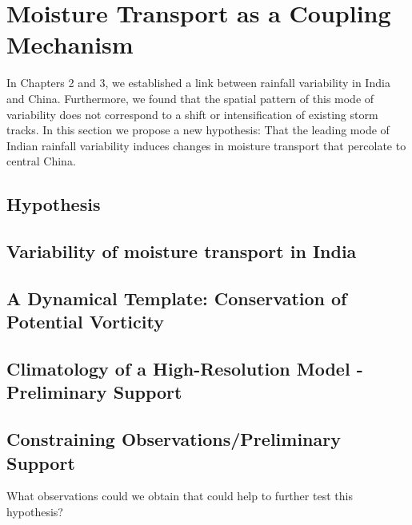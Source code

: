 \chapter{Moisture Transport as a Coupling Mechanism}

In Chapters 2 and 3, we established a link between rainfall variability in India and China. Furthermore, we found that the spatial pattern of this mode of variability does not correspond to a shift or intensification of existing storm tracks. In this section we propose a new hypothesis: That the leading mode of Indian rainfall variability induces changes in moisture transport that percolate to central China.

\section{Hypothesis}

\section{Variability of moisture transport in India}

\section{A Dynamical Template: Conservation of Potential Vorticity}

\section{Climatology of a High-Resolution Model - Preliminary Support}

\section{Constraining Observations/Preliminary Support}

What observations could we obtain that could help to further test this hypothesis?